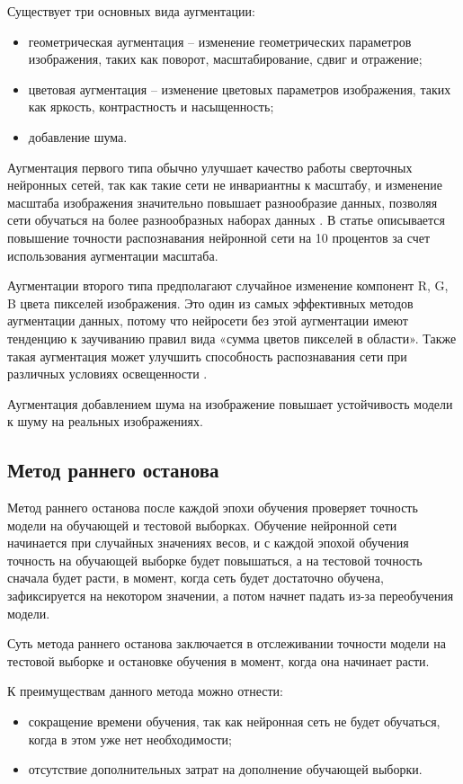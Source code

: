 Существует три основных вида аугментации:
\begin{itemize}
	\item геометрическая аугментация -- изменение геометрических параметров изображения, таких как поворот, масштабирование, сдвиг и отражение;
	\item цветовая аугментация -- изменение цветовых параметров изображения, таких как яркость, контрастность и насыщенность;
	\item добавление шума.
\end{itemize}

Аугментация первого типа обычно улучшает качество работы сверточных нейронных сетей, так как такие сети не инвариантны к масштабу, и изменение масштаба изображения значительно повышает разнообразие данных, позволяя сети обучаться на более разнообразных наборах данных \cite{augmentation}. В статье \cite{augmentation1} описывается повышение точности распознавания нейронной сети на 10 процентов за счет использования аугментации масштаба.

Аугментации второго типа предполагают случайное изменение компонент R, G, B цвета пикселей изображения. Это один из самых эффективных методов аугментации данных, потому что нейросети без этой аугментации имеют тенденцию к заучиванию правил вида «сумма цветов пикселей в области». Также такая аугментация может улучшить способность распознавания сети при различных условиях освещенности \cite{augmentation}.

Аугментация добавлением шума на изображение повышает устойчивость модели к шуму на реальных изображениях.

\subsection{Метод раннего останова}
Метод раннего останова после каждой эпохи обучения проверяет точность модели на обучающей и тестовой выборках. Обучение нейронной сети начинается при случайных значениях весов, и с каждой эпохой обучения точность на обучающей выборке будет повышаться, а на тестовой точность сначала будет расти, в момент, когда сеть будет достаточно обучена, зафиксируется на некотором значении, а потом начнет падать из-за переобучения модели.

Суть метода раннего останова заключается в отслеживании точности модели на тестовой выборке и остановке обучения в момент, когда она начинает расти.

К преимуществам данного метода можно отнести:
\begin{itemize}
	\item сокращение времени обучения, так как нейронная сеть не будет обучаться, когда в этом уже нет необходимости;
	\item отсутствие дополнительных затрат на дополнение обучающей выборки.
\end{itemize}

